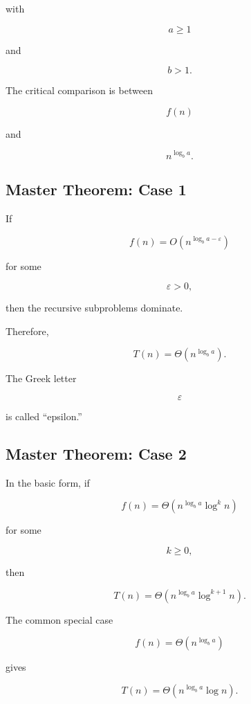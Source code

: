 with

\[
a\geq1
\]

and

\[
b>1.
\]

The critical comparison is between

\[
f(n)
\]

and

\[
n^{\log_b a}.
\]

\subsection{Master Theorem: Case 1}
\label{subsec:master-theorem-case-one}

If

\[
f(n)
=
O\left(
n^{\log_b a-\varepsilon}
\right)
\]

for some

\[
\varepsilon>0,
\]

then the recursive subproblems dominate.

Therefore,

\[
\boxed{
T(n)
=
\Theta\left(
n^{\log_ba}
\right).
}
\]

The Greek letter

\[
\varepsilon
\]

is called ``epsilon.''

\subsection{Master Theorem: Case 2}
\label{subsec:master-theorem-case-two}

In the basic form, if

\[
f(n)
=
\Theta\left(
n^{\log_b a}\log^k n
\right)
\]

for some

\[
k\geq0,
\]

then

\[
\boxed{
T(n)
=
\Theta\left(
n^{\log_b a}
\log^{k+1}n
\right).
}
\]

The common special case

\[
f(n)
=
\Theta\left(
n^{\log_ba}
\right)
\]

gives

\[
\boxed{
T(n)
=
\Theta\left(
n^{\log_ba}\log n
\right).
}
\]

